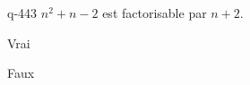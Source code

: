\begin{truefalse}{q-443}
$n^2+n-2$ est factorisable par $n+2$.
\item* Vrai
\item Faux
\end{truefalse}

